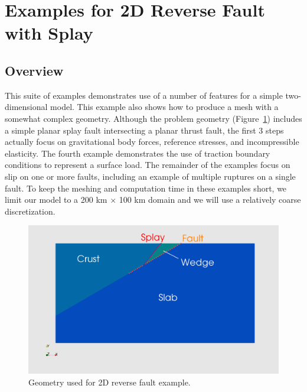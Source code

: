 \section{Examples for 2D Reverse Fault with Splay}
\label{sec:example:reverse:2d}

\subsection{Overview}

This suite of examples demonstrates use of a number of features for a
simple two-dimensional model. This example also shows how to produce
a mesh with a somewhat complex geometry. Although the problem geometry
(Figure~\ref{fig:example:reverse:2d:geometry}) includes a simple
planar splay fault intersecting a planar thrust fault, the first 3
steps actually focus on gravitational body forces, reference stresses,
and incompressible elasticity. The fourth example demonstrates the use
of traction boundary conditions to represent a surface load. The
remainder of the examples focus on slip on one or more faults,
including an example of multiple ruptures on a single fault.
To keep the meshing and computation time in these
examples short, we limit our model to a 200 km $\times$ 100 km
domain and we will use a relatively coarse discretization.

\begin{figure}[htbp]
  \includegraphics[width=4.5in]{examples/figs/reverse2d_geometry}
  \caption{Geometry used for 2D reverse fault example.}
  \label{fig:example:reverse:2d:geometry}
\end{figure}

